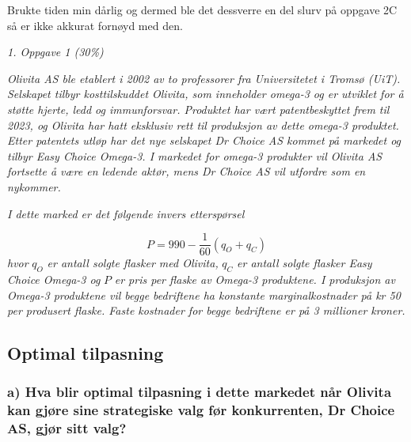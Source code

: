 \documentclass[
  12pt,
  a4paper,
  DIV=11,
  numbers=noendperiod]{scrartcl}
\renewcommand*\contentsname{Table of contents}
\newcommand\contentsname{Table of contents}
\begin{document}
Brukte tiden min dårlig og dermed ble det dessverre en del slurv på oppgave 2C så er ikke akkurat fornøyd med den.






\newpage
\hypersetup{linkcolor=black}
\renewcommand{\contentsname}{Innholdsfortegnelse}
\renewcommand*{\figureautorefname}{Figur}
\renewcommand*{\tableautorefname}{Tabell}
\tableofcontents
\listoffigures
\listoftables
\hypersetup{linkcolor=blue}
\newpage

\begin{center}
    \Large
    \textit{1.  Oppgave 1 (30\%)}
\end{center}

\textit{Olivita AS ble etablert i 2002 av to professorer fra Universitetet i Tromsø (UiT). Selskapet tilbyr kosttilskuddet Olivita, som inneholder omega-3 og er utviklet for å støtte hjerte, ledd og immunforsvar. Produktet har vært patentbeskyttet frem til 2023, og Olivita har hatt eksklusiv rett til produksjon av dette omega-3 produktet. Etter patentets utløp har det nye selskapet Dr Choice AS kommet på markedet og tilbyr Easy Choice Omega-3. I markedet for omega-3 produkter vil Olivita AS fortsette å være en ledende aktør, mens Dr Choice AS vil utfordre som en nykommer.}

\textit{I dette marked er det følgende invers etterspørsel}

$$
P = 990 - \frac{1}{60}(q_O + q_C)
$$ 
\textit{hvor} $q_O$ \textit{er antall solgte flasker med Olivita,} $q_C$ \textit{er antall solgte flasker Easy Choice Omega-3 og} $P$ \textit{er pris per flaske av Omega-3 produktene. I produksjon av Omega-3 produktene vil begge bedriftene ha konstante marginalkostnader på kr 50 per produsert flaske. Faste kostnader for begge bedriftene er på 3 millioner kroner.}

\subsection{Optimal tilpasning}\label{optimal-tilpasning}

\subsubsection{a) Hva blir optimal tilpasning i dette markedet når Olivita kan gjøre sine strategiske valg før konkurrenten, Dr Choice AS, gjør sitt valg?}\label{a-hva-blir-optimal-tilpasning-i-dette-markedet-nuxe5r-olivita-kan-gjuxf8re-sine-strategiske-valg-fuxf8r}
\end{document}
